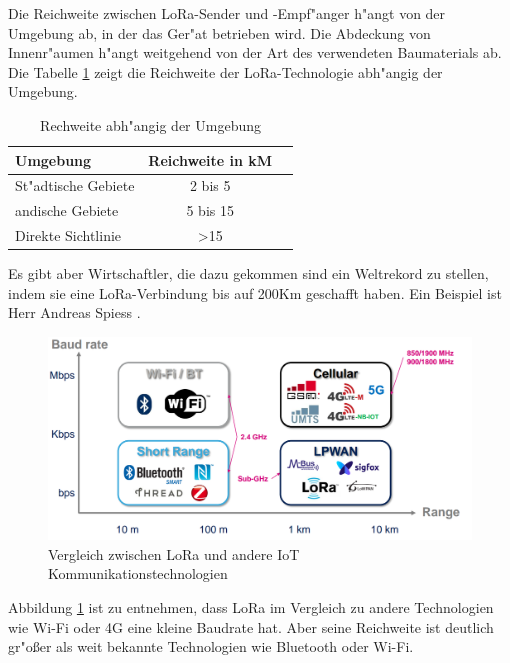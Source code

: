 Die Reichweite zwischen LoRa-Sender und -Empf"anger h"angt von der 
Umgebung ab, in der das Ger"at betrieben wird. Die Abdeckung von 
Innenr"aumen h"angt weitgehend von der Art des verwendeten Baumaterials 
ab. Die Tabelle \ref{tab:Range} zeigt die Reichweite der 
LoRa-Technologie abh"angig der Umgebung.

\begin{center}
	\begin{table}[htbp] 
		\centering 
		\Large
		\begin{tabular}{l|c|r}
			\textbf{Umgebung} & \textbf{Reichweite in kM} \\
			\hline
			St"adtische Gebiete	& 2 bis 5 \\
			\hline
			andische Gebiete & 5 bis 15\\
			\hline
			Direkte Sichtlinie	& >15 
		\end{tabular} 
		\caption{Rechweite abh"angig der Umgebung} 
		\label{tab:Range} 
		
	\end{table}
\end{center}

Es gibt aber Wirtschaftler, die dazu gekommen sind ein Weltrekord zu 
stellen, indem sie eine LoRa-Verbindung bis auf 200Km geschafft haben. 
Ein Beispiel ist Herr Andreas Spiess \cite{AndreasSpiess}.


\vspace{10cm}
\begin{figure}[h]
	\centering
	\includegraphics[width=14cm]{source/images/Communications_tech}
	\caption{Vergleich zwischen LoRa und andere IoT 
	Kommunikationstechnologien \cite{LoRaWAN}\label{fig:Netz}}
\end{figure}
Abbildung \ref{fig:Netz} ist zu entnehmen, dass LoRa im Vergleich zu 
andere Technologien wie Wi-Fi oder 4G eine kleine Baudrate hat. Aber 
seine Reichweite ist deutlich gr"o\ss{}er als weit bekannte 
Technologien wie Bluetooth oder Wi-Fi.

